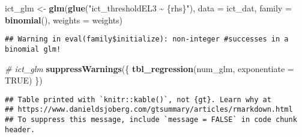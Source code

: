 \documentclass[
]{article}
\newenvironment{Shaded}{\begin{snugshade}}{\end{snugshade}}
\newcommand{\AttributeTok}[1]{\textcolor[rgb]{0.13,0.29,0.53}{#1}}
\newcommand{\CommentTok}[1]{\textcolor[rgb]{0.56,0.35,0.01}{\textit{#1}}}
\newcommand{\ConstantTok}[1]{\textcolor[rgb]{0.56,0.35,0.01}{#1}}
\newcommand{\FunctionTok}[1]{\textcolor[rgb]{0.13,0.29,0.53}{\textbf{#1}}}
\newcommand{\NormalTok}[1]{#1}
\newcommand{\OtherTok}[1]{\textcolor[rgb]{0.56,0.35,0.01}{#1}}
\newcommand{\StringTok}[1]{\textcolor[rgb]{0.31,0.60,0.02}{#1}}
\begin{document}
\begin{Shaded}
\begin{Highlighting}[]
\NormalTok{ict\_glm }\OtherTok{\textless{}{-}} \FunctionTok{glm}\NormalTok{(}\FunctionTok{glue}\NormalTok{(}\StringTok{"ict\_thresholdEL3 \textasciitilde{} \{rhs\}"}\NormalTok{), }\AttributeTok{data =}\NormalTok{ ict\_dat, }\AttributeTok{family =} \FunctionTok{binomial}\NormalTok{(), }\AttributeTok{weights =}\NormalTok{ weights)}
\end{Highlighting}
\end{Shaded}

\begin{verbatim}
## Warning in eval(family$initialize): non-integer #successes in a binomial glm!
\end{verbatim}

\begin{Shaded}
\begin{Highlighting}[]
\CommentTok{\# ict\_glm}
\FunctionTok{suppressWarnings}\NormalTok{(\{}
  \FunctionTok{tbl\_regression}\NormalTok{(num\_glm, }\AttributeTok{exponentiate =} \ConstantTok{TRUE}\NormalTok{)}
\NormalTok{\})}
\end{Highlighting}
\end{Shaded}

\begin{verbatim}
## Table printed with `knitr::kable()`, not {gt}. Learn why at
## https://www.danieldsjoberg.com/gtsummary/articles/rmarkdown.html
## To suppress this message, include `message = FALSE` in code chunk header.
\end{verbatim}
\end{document}
